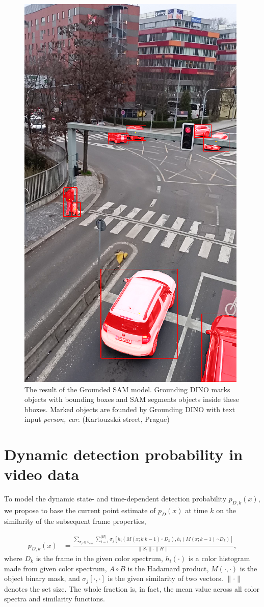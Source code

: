 \begin{figure}[h]
  \centering
  \includegraphics[width=0.35\linewidth]{text/chapter_04/imgs/DINO_example}
  \caption{The result of the Grounded SAM model. Grounding DINO marks objects with bounding boxes and SAM segments
  objects inside these bboxes. Marked objects are founded by Grounding DINO with text input \textit{person, car}. (Kartouzská street, Prague)}
  \label{fig:GroundedSAM}
\end{figure}



\section{Dynamic detection probability in video data}
\label{sec:dynamic_pd}
To model the dynamic state- and time-dependent detection probability $p_{D,k}(x)$, we propose to base the current
point estimate of $p_{D}(x)$ at time $k$ on the similarity of the subsequent frame properties,

  \begin{align}
    p_{D,k}(x) &= \frac{\sum_{\sigma_j \in S_{sim}} \sum_{i=1}^{|H|}
      \sigma_j\left[h_i\left(M(x; k|k-1) \!\circ\! D_k\right),
        h_i\left(M(x; k-1) \!\circ\! D_k\right)\right]}{\|S_c\| \cdot \|H\|}, \label{eq:similarity}
  \end{align}
where $D_k$ is the frame in the given color spectrum, $h_i(\cdot)$ is a color histogram made from given color spectrum, $A\circ B$ is the Hadamard product, $M(\cdot, \cdot)$ is the object binary mask, and $\sigma_j[\cdot, \cdot]$ is
the given similarity of two vectors. $\|\cdot\|$ denotes the set size. The whole
fraction is, in fact, the mean value across all color spectra and similarity functions.

